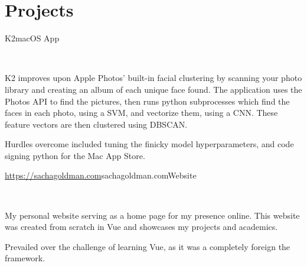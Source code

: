 \documentclass[]{style}
\begin{document}
\section{Projects}

\begin{entrylist}

\vspace{2mm}

\entry
{K2}{macOS App}
{ ~ \vspace{-2.5mm}

  

K2 improves upon Apple Photos' built-in facial clustering by scanning your photo library and creating an album of each unique face found. The application uses the Photos API to find the pictures, then runs python subprocesses which find the faces in each photo, using a SVM, and vectorize them, using a CNN. These feature vectors are then clustered using DBSCAN.
\vspace{1mm}

Hurdles overcome included tuning the finicky model hyperparameters, and code signing python for the Mac App Store.}

\vspace{2mm}

\entry
{\url{https://sachagoldman.com}{sachagoldman.com}}{Website}
{ ~ \vspace{-2.5mm}

 

My personal website serving as a home page for my presence online. This website was created from scratch in Vue and showcases my projects and academics. 
\vspace{1mm}

Prevailed over the challenge of learning Vue, as it was a completely foreign the framework.}

\end{entrylist}
\end{document}
